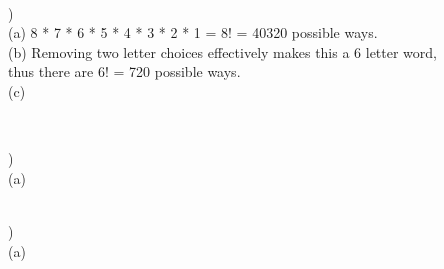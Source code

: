 \documentclass[12pt]{article}
\begin{document}
\hrulefill \\


)\\
\indent (a) 8 * 7 * 6 * 5 * 4 * 3 * 2 * 1 = 8! = 40320 possible ways.\\

\indent (b) Removing two letter choices effectively makes this a 6 letter word, \\
\indent thus there are 6! = 720 possible ways.\\

\indent (c)


\hrulefill \\
\pagebreak


)\\
\indent (a) 


\hrulefill \\


)\\
\indent (a) 
\end{document}
